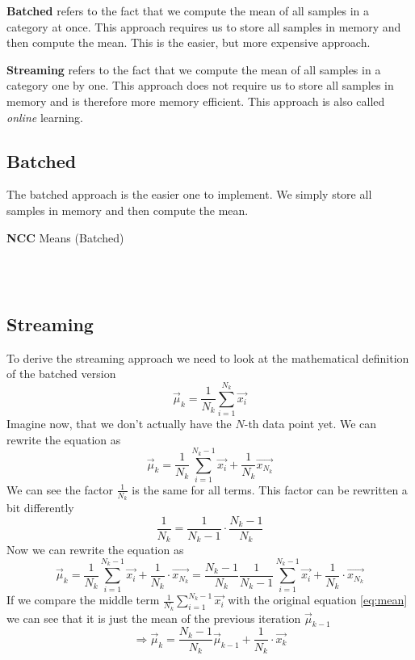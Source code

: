 \textbf{Batched} refers to the fact that we compute the mean of all samples in a category at once. This approach requires
us to store all samples in memory and then compute the mean. This is the easier, but more expensive approach.

\textbf{Streaming} refers to the fact that we compute the mean of all samples in a category one by one. This approach does not require
us to store all samples in memory and is therefore more memory efficient. This approach is also called \textit{online} learning.

\subsection{Batched}
The batched approach is the easier one to implement. We simply store all samples in memory and then compute the mean.
\begin{algorithm}
\LinesNumbered
\caption{\textbf{NCC} Means (Batched)}\label{alg:ncc_batched}
\\
\\
\end{algorithm}

\subsection{Streaming}
To derive the streaming approach we need to look at the mathematical definition of the batched version
\begin{equation}
  \vec{\mu}_k = \frac{1}{N_k}\sum^{N_k}_{i=1}\vec{x_i}
\end{equation}
Imagine now, that we don't actually have the $N$-th data point yet.
We can rewrite the equation as
\begin{equation}
  \vec{\mu}_k = \frac{1}{N_k}\sum^{N_k-1}_{i=1}\vec{x_i} + \frac{1}{N_k}\vec{x_{N_k}}
\end{equation}
We can see the factor $\frac{1}{N_k}$ is the same for all terms. This factor can be rewritten a bit differently
\begin{equation}
  \frac{1}{N_k} = \frac{1}{N_k-1} \cdot \frac{N_k-1}{N_k}
\end{equation}
Now we can rewrite the equation as
\begin{equation}
  \vec{\mu}_k = \frac{1}{N_k}\sum^{N_k-1}_{i=1}\vec{x_i} + \frac{1}{N_k} \cdot \vec{x_{N_k}} = \frac{N_k - 1}{N_k}\frac{1}{N_k-1}\sum^{N_k-1}_{i=1}\vec{x_i} + \frac{1}{N_k} \cdot \vec{x_{N_k}}
\end{equation}
If we compare the middle term $\frac{1}{N_k}\sum^{N_k-1}_{i=1}\vec{x_i}$ with the original equation \eqref{eq:mean} we can see that it is just the mean of the previous iteration $\vec{\mu}_{k-1}$
\begin{equation}
  \Rightarrow \vec{\mu}_{k} = \frac{N_k - 1}{N_k}\vec{\mu}_{k-1} + \frac{1}{N_k} \cdot \vec{x_k}
  \label{eq:iterative-mean}
\end{equation}

